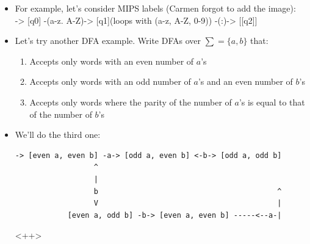 \documentclass[12pt]{article}
\begin{document}
\begin{itemize}
\begin{itemize}
\begin{itemize}
                \end{itemize} 
        \end{itemize}
    \item For example, let's consider MIPS labels (Carmen forgot to add the image): \\
        -> [q0] -(a-z. A-Z)-> [q1](loops with (a-z, A-Z, 0-9)) -(:)-> [[q2]]
    \item Let's try another DFA example.  Write DFAs over $\sum = \{a, b\}$ that:
        \begin{enumerate}
            \item Accepts only words with an even number of $a$'s
            \item Accepts only words with an odd number of $a$'s and an even number of $b$'s
            \item Accepts only words where the parity of the number of $a$'s is equal to that of the number of $b$'s
        \end{enumerate}
        \newpage
    \item We'll do the third one:
        \begin{lstlisting}[mathescape, numbers=none, breaklines=true]
        -> [even a, even b] -a-> [odd a, even b] <-b-> [odd a, odd b]
                  ^
                  |
                  b                                         ^
                  V                                         |
            [even a, odd b] -b-> [even a, even b] -----<--a-|
        \end{lstlisting}
        <++>

\end{itemize}
\end{document}
